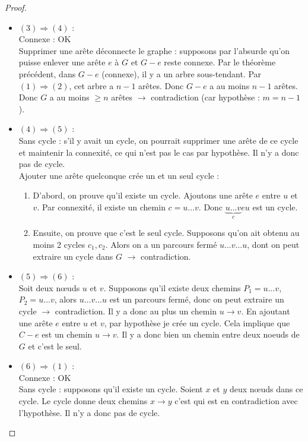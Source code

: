 \begin{mytheo} 
\begin{proof}
\begin{itemize}
  \item $(3) \Rightarrow (4)$ :\\
  Connexe : OK\\
  Supprimer une arête déconnecte le graphe : supposons par l'absurde qu'on puisse enlever une arête $e$ à $G$ et $G-e$ reste connexe. Par le théorème précédent, dans $G-e$ (connexe), il y a un arbre sous-tendant. Par $(1) \Rightarrow (2)$, cet arbre a $n-1$ arêtes. Donc $G-e$ a au moins $n-1$ arêtes. Donc $G$ a au moins $\geq n$ arêtes $\rightarrow$ contradiction (car hypothèse : $m = n-1$).

  \item $(4) \Rightarrow (5)$ :\\
  Sans cycle : s'il y avait un cycle, on pourrait supprimer une arête de ce cycle et maintenir la connexité, ce qui n'est pas le cas par hypothèse. Il n'y a donc pas de cycle.\\
  Ajouter une arête quelconque crée un et un seul cycle :
  \begin{enumerate}[$\bullet$]
  \item D'abord, on prouve qu'il existe un cycle. Ajoutons une arête $e$ entre $u$ et $v$. Par connexité, il existe un chemin $c = u \ldots v$. Donc $\underbrace{u \ldots v}_{c}eu$ est un cycle.
  \item Ensuite, on prouve que c'est le seul cycle. Supposons qu'on ait obtenu au moins 2 cycles $c_1, c_2$. Alors on a un parcours fermé $u \ldots v \ldots u$, dont on peut extraire un cycle dans $G$ $\rightarrow$ contradiction.
  \end{enumerate}

  \item $(5) \Rightarrow (6)$ :\\
  Soit deux nœuds $u$ et $v$. Supposons qu'il existe deux chemins $P_1 = u \ldots v$, $P_2 = u \ldots v$, alors $u \ldots v \ldots u$ est un parcours fermé, donc on peut extraire un cycle $\rightarrow$ contradiction. Il y a donc au plus un chemin $u \rightarrow v$. En ajoutant une arête $e$ entre $u$ et $v$, par hypothèse je crée un cycle. Cela implique que $C-e$ est un chemin $u \rightarrow v$. Il y a donc bien un chemin entre deux noeuds de $G$ et c'est le seul.

  \item $(6) \Rightarrow (1)$ :\\
  Connexe : OK\\
  Sans cycle : supposons qu'il existe un cycle. Soient $x$ et $y$ deux nœuds dans ce cycle. Le cycle donne deux chemins $x \rightarrow y$ c'est qui est en contradiction avec l'hypothèse. Il n'y a donc pas de cycle.

  \end{itemize}
  \end{proof}
\end{mytheo}

